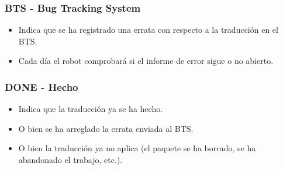 \documentclass{beamer}
\makeatletter
\newcommand{\confurl}{\url{http://lesthack.com.mx}}
\newcommand{\authdata}{Jorge Luis Hernández — {\tt lesthack@gmail.com}}
\makeatother
\begin{document}
\begin{frame}
  \frametitle {BTS - Bug Tracking System}
  \begin{itemize}
  \item Indica que se ha registrado una errata con respecto a la traducción en el BTS.
  \item Cada día el robot comprobará si el informe de error sigue o no abierto.
  \end{itemize}
\end{frame}

\begin{frame}
  \frametitle {DONE - Hecho}
  \begin{itemize}
  \item Indica que la traducción ya se ha hecho.
  \item O bien se ha arreglado la errata enviada al BTS.
  \item O bien la traducción ya no aplica (el paquete se ha borrado, se ha abandonado el trabajo, etc.).
  \end{itemize}
\end{frame}


\end{document}
